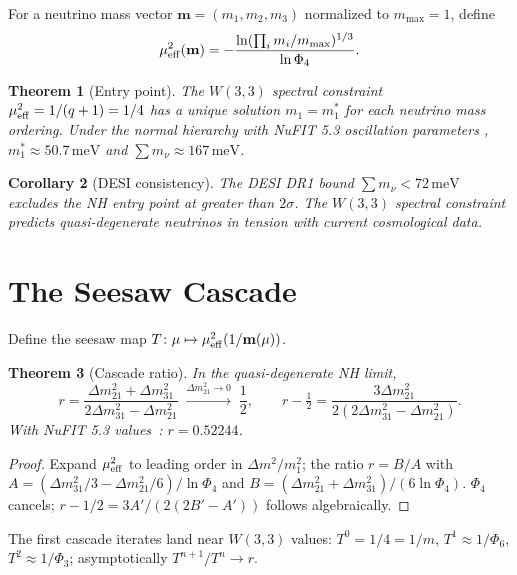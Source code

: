 \documentclass[12pt]{article}
\newtheorem{theorem}{Theorem}[section]
\newtheorem{corollary}[theorem]{Corollary}
\begin{document}
For a neutrino mass vector $\mathbf{m}=(m_1,m_2,m_3)$ normalized to $m_{\max}=1$,
define
\[
  \mu_{\rm eff}^2(\mathbf{m}) = -\frac{\ln(\prod_i m_i/m_{\max})^{1/3}}{\ln\Phi_4}.
\]

\begin{theorem}[Entry point]
The $W(3,3)$ spectral constraint $\mu_{\rm eff}^2=1/(q+1)=1/4$
has a unique solution $m_1=m_1^*$ for each neutrino mass ordering.
Under the normal hierarchy with NuFIT 5.3 oscillation parameters \cite{NuFIT53},
$m_1^*\approx 50.7\,\mathrm{meV}$ and $\sum m_\nu\approx 167\,\mathrm{meV}$.
\end{theorem}

\begin{corollary}[DESI consistency]
The DESI DR1 bound $\sum m_\nu < 72\,\mathrm{meV}$ \cite{DESI2024}
excludes the NH entry point at greater than $2\sigma$.
The $W(3,3)$ spectral constraint predicts quasi-degenerate neutrinos
in tension with current cosmological data.
\end{corollary}

\section{The Seesaw Cascade}
\label{sec:seesaw}

Define the seesaw map $T\colon\mu\mapsto\mu_{\rm eff}^2(1/\mathbf{m}(\mu))$.

\begin{theorem}[Cascade ratio]\label{thm:cascade}
In the quasi-degenerate NH limit,
\[
  r = \frac{\Delta m^2_{21}+\Delta m^2_{31}}{2\Delta m^2_{31}-\Delta m^2_{21}}
  \;\xrightarrow{\Delta m^2_{21}\to 0}\;\frac{1}{2},
  \qquad r-\tfrac{1}{2} = \frac{3\Delta m^2_{21}}{2(2\Delta m^2_{31}-\Delta m^2_{21})}.
\]
With NuFIT 5.3 values~\cite{NuFIT53}: $r=0.52244$.
\end{theorem}
\begin{proof}
Expand $\mu_{\rm eff}^2$ to leading order in $\Delta m^2/m_1^2$;
the ratio $r=B/A$ with $A=(\Delta m^2_{31}/3-\Delta m^2_{21}/6)/\ln\Phi_4$
and $B=(\Delta m^2_{21}+\Delta m^2_{31})/(6\ln\Phi_4)$.
$\Phi_4$ cancels; $r-1/2=3A'/(2(2B'-A'))$ follows algebraically.
\end{proof}

The first cascade iterates land near $W(3,3)$ values:
$T^0=1/4=1/m$, $T^1\approx 1/\Phi_6$, $T^2\approx 1/\Phi_3$;
asymptotically $T^{n+1}/T^n\to r$.
\end{document}
